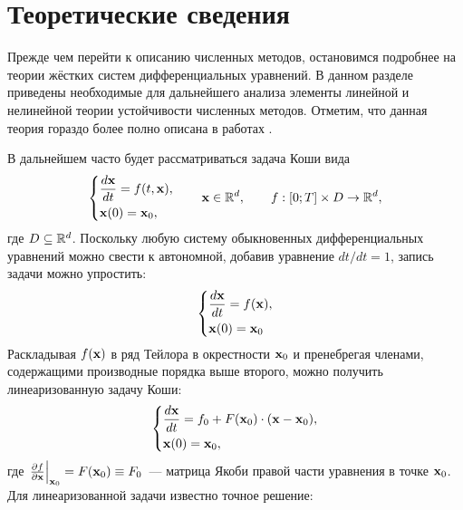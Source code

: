 \chapter{Теоретические сведения}
\label{chapter:theory} 

Прежде чем перейти к описанию численных методов, остановимся подробнее на теории жёстких систем дифференциальных уравнений.
В данном разделе приведены необходимые для дальнейшего анализа элементы линейной и нелинейной теории устойчивости численных методов.
Отметим, что данная теория гораздо более полно описана в работах \cite{heirer1999solvingode2, lambert1991methods}.

В дальнейшем часто будет рассматриваться задача Коши вида
%
\begin{equation}
    \label{eq:initial_value_problem}
    \begin{dcases}
        \frac{d \mathbf{x}}{d t} = f(t, \mathbf{x}), \\
        \mathbf{x}(0) = \mathbf{x}_0,
    \end{dcases}
    \qquad
    \mathbf{x} \in \mathbb{R}^d, \qquad f: [0;T] \times D \to \mathbb{R}^d,
\end{equation}
%
где $ D \subseteq \mathbb{R}^d $.
Поскольку любую систему обыкновенных дифференциальных уравнений можно свести к автономной, добавив уравнение $ dt / dt = 1 $,
запись задачи можно упростить:
%
\begin{equation}
    \label{eq:autonomous_initial_value_problem}
    \begin{dcases}
        \frac{d \mathbf{x}}{d t} = f(\mathbf{x}), \\
        \mathbf{x}(0) = \mathbf{x}_0
    \end{dcases}
\end{equation}
%
Раскладывая $ f(\mathbf{x}) $ в ряд Тейлора в окрестности $ \mathbf{x}_0 $ и пренебрегая членами, содержащими производные порядка выше второго, можно получить линеаризованную задачу Коши:
%
\begin{equation}
    \label{eq:linearized_initial_value_problem}
    \begin{dcases}
        \frac{d \mathbf{x}}{d t} = f_0 + F(\mathbf{x}_0) \cdot (\mathbf{x} - \mathbf{x}_0), \\
        \mathbf{x}(0) = \mathbf{x}_0,
    \end{dcases}
\end{equation}
%
где $ \left. \frac{\partial f}{\partial \mathbf{x}} \right|_{\mathbf{x}_0} = F(\mathbf{x}_0) \equiv F_0 $~--- матрица Якоби правой части уравнения в точке $ \mathbf{x}_0 $.
Для линеаризованной задачи известно точное решение:

